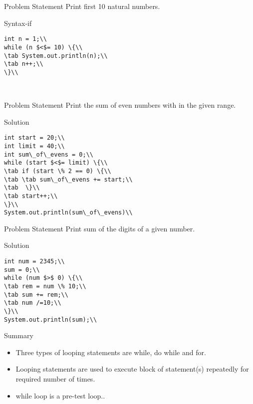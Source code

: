 \documentclass[aspectratio=169,14pt,usenames,dvipsnames]{beamer}
\newcommand\tab[1][1cm]{\hspace*{#1}}
\begin{document}
\begin{frame}{Problem Statement}
Print first 10 natural numbers.
\end{frame}

\begin{frame}{Syntax-if}
\begin{lstlisting}
int n = 1;\\
while (n $<$= 10) \{\\
\tab System.out.println(n);\\
\tab n++;\\
\}\\
\end{lstlisting}\\
\end{frame}

\begin{frame}{Problem Statement}
Print the sum of even numbers with in the
given range.
\end{frame}

\begin{frame}{Solution}
\begin{lstlisting}
int start = 20;\\
int limit = 40;\\
int sum\_of\_evens = 0;\\
while (start $<$= limit) \{\\
\tab if (start \% 2 == 0) \{\\
\tab \tab sum\_of\_evens += start;\\
\tab  \}\\
\tab start++;\\
\}\\
System.out.println(sum\_of\_evens)\\
\end{lstlisting}
\end{frame}

\begin{frame}{Problem Statement}
Print sum of the digits of a given number.
\end{frame}


\begin{frame}{Solution}
\begin{lstlisting}
int num = 2345;\\
sum = 0;\\
while (num $>$ 0) \{\\
\tab rem = num \% 10;\\
\tab sum += rem;\\
\tab num /=10;\\
\}\\
System.out.println(sum);\\
\end{lstlisting}
\end{frame}



\begin{frame}{Summary}
\begin{itemize}
    \item Three types of looping statements are
while, do while and for.
\item Looping statements are used to execute
block of statement(s) repeatedly for
required number of times.
\item while loop is a pre-test loop..
\end{itemize}
\end{frame}
\end{document}
